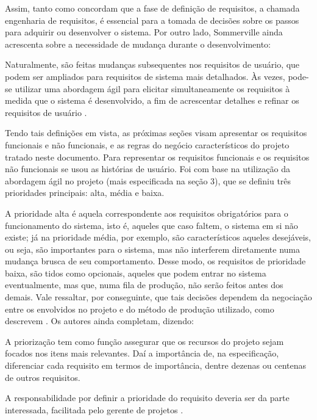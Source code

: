Assim, tanto  como  concordam que a fase de definição de requisitos, a chamada engenharia de requisitos, é essencial para a tomada de decisões sobre os passos para adquirir ou desenvolver o sistema. Por outro lado, Sommerville ainda acrescenta sobre a necessidade de mudança durante o desenvolvimento:

\begin{citacao}
Naturalmente, são feitas mudanças subsequentes nos requisitos de usuário, que podem ser ampliados para requisitos de sistema mais detalhados. Às vezes, pode-se utilizar uma abordagem ágil para elicitar simultaneamente os requisitos à medida que o sistema é desenvolvido, a fim de acrescentar detalhes e refinar os requisitos de usuário \cite{SOMMERVILLE:2019}.
\end{citacao}

Tendo tais definições em vista, as próximas seções visam apresentar os requisitos funcionais e não funcionais, e as regras do negócio característicos do projeto tratado neste documento. Para representar os requisitos funcionais e os requisitos não funcionais se usou as histórias de usuário. Foi com base na utilização da abordagem ágil no projeto (mais especificada na seção 3), que se definiu três prioridades principais: alta, média e baixa. 

A prioridade alta é aquela correspondente aos requisitos obrigatórios para o funcionamento do sistema, isto é, aqueles que caso faltem, o sistema em si não existe; já na prioridade média, por exemplo, são característicos aqueles desejáveis, ou seja, são importantes para o sistema, mas não interferem diretamente numa mudança brusca de seu comportamento. Desse modo, os requisitos de prioridade baixa, são tidos como opcionais, aqueles que podem entrar no sistema eventualmente, mas que, numa fila de produção, não serão feitos antes dos demais. Vale ressaltar, por conseguinte, que tais decisões dependem da negociação entre os envolvidos no projeto e do método de produção utilizado, como descrevem . Os autores ainda completam, dizendo:


\begin{citacao}
A priorização tem como função assegurar que os recursos do projeto sejam focados nos itens mais relevantes. Daí a importância de, na especificação, diferenciar cada requisito em termos de importância, dentre dezenas ou centenas de outros requisitos.

A responsabilidade por definir a prioridade do requisito deveria ser da parte interessada, facilitada pelo gerente de projetos \cite{vazquezsimoes:2016}.
\end{citacao}


